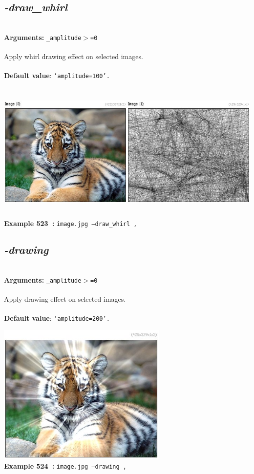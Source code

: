 \documentclass[a4paper,11pt,twoside]{book}
\begin{document}
\subsection{\emph{-draw\_whirl} }\vspace*{-0.5em}
~\\\textbf{Arguments: } 
{\small \texttt{\_amplitude$>$=0}}\\~\\
Apply whirl drawing effect on selected images.
~\\~\\\textbf{Default value}: {\small \texttt{'amplitude=100'.}}
\begin{center}\includegraphics[keepaspectratio=true,height=7cm,width=\textwidth]{img/gmic_def523.jpg}\\
{\footnotesize \textbf{Example 523~:} \texttt{image.jpg --draw\_whirl ,}}
\end{center}

\subsection{\emph{-drawing} }\vspace*{-0.5em}
~\\\textbf{Arguments: } 
{\small \texttt{\_amplitude$>$=0}}\\~\\
Apply drawing effect on selected images.
~\\~\\\textbf{Default value}: {\small \texttt{'amplitude=200'.}}
\begin{center}\includegraphics[keepaspectratio=true,height=7cm,width=\textwidth]{img/gmic_def524.jpg}\\
{\footnotesize \textbf{Example 524~:} \texttt{image.jpg --drawing ,}}
\end{center}
\end{document}
